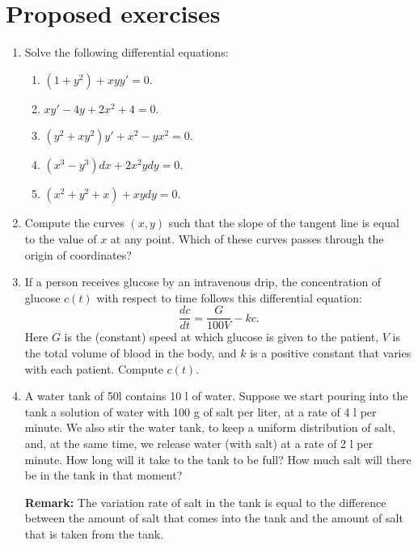 \section{Proposed exercises}
\begin{enumerate}[leftmargin=*]

\item Solve the following differential equations:
      \begin{enumerate}
      \item $(1+y^{2})+xyy'=0$.
      \item $xy'-4y+2x^2+4=0$.
      \item $(y^{2}+xy^{2})y'+x^{2}-yx^{2}=0$.
      \item $(x^3-y^3)dx+2x^2ydy=0$.
      \item $(x^2+y^2+x)+xydy=0$.
      \end{enumerate}

\item Compute the curves $(x,y)$ such that the slope of the tangent line is equal to the value of $x$ at any point.
      Which of these curves passes through the origin of coordinates?

\item If a person receives glucose by an intravenous drip, the concentration of glucose $c(t)$ with respect to time follows this differential equation:
      \[
      \frac{dc}{dt}=\frac{G}{100V}-kc.
      \]
      Here $G$ is the (constant) speed at which glucose is given to the patient, $V$ is the total volume of blood in the body, and $k$ is a positive constant that varies with each patient.
      Compute $c(t)$.

\item A water tank of 50l contains 10 l of water.
      Suppose we start pouring into the tank a solution of water with 100 g of salt per liter, at a rate of 4 l per minute.
      We also stir the water tank, to keep a uniform distribution of salt, and, at the same time, we release water (with salt) at a rate of 2 l per minute.
      How long will it take to the tank to be full?
      How much salt will there be in the tank in that moment?

      \noindent\textbf{Remark:} The variation rate of salt in the tank is equal to the difference between the amount of salt that comes into the tank and the amount of salt that is taken from the tank.
\end{enumerate}

